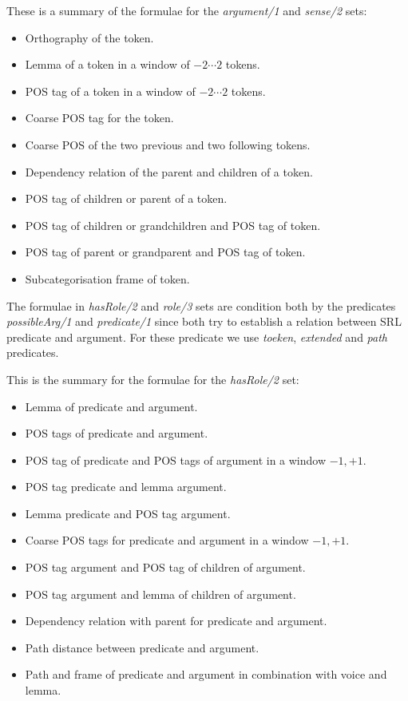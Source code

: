 These is a summary of the formulae for the \emph{argument/1} and 
\emph{sense/2} sets:
\begin{itemize}\addtolength{\itemsep}{-0.5\baselineskip}
    \item Orthography of the token.
    \item Lemma of a token in a window of $-2 \cdots 2$ tokens.
    \item POS tag of a token in a window of $-2 \cdots 2$ tokens.
    \item Coarse POS tag for the token.
    \item Coarse POS of the two previous and two following tokens.
    \item Dependency relation of the parent and children of a token.
    \item POS tag of children or parent of a token.
    \item POS tag of children or grandchildren and POS tag of token.
    \item POS tag of parent or grandparent and POS tag of token.
    \item Subcategorisation frame of token.
\end{itemize}

The formulae in \emph{hasRole/2} and \emph{role/3} sets are condition both by 
the predicates \emph{possibleArg/1} and \emph{predicate/1} since both try 
to establish a relation between SRL predicate and argument. For these predicate 
we use \emph{toeken}, \emph{extended} and \emph{path} predicates.

This is the summary for the formulae for the \emph{hasRole/2} set:
\begin{itemize}\addtolength{\itemsep}{-0.5\baselineskip}
    \item Lemma of predicate and argument.
    \item POS tags of predicate and argument.
    \item POS tag of predicate and POS tags of argument in a window $-1,+1$.
    \item POS tag predicate and lemma argument.
    \item Lemma predicate and POS tag argument.
    \item Coarse POS tags for predicate and argument in a window $-1,+1$.
    \item POS tag argument and POS tag of children of argument.
    \item POS tag argument and lemma  of children of argument.
    \item Dependency relation with parent for predicate and argument.
    \item Path distance between predicate and argument.
    \item Path and frame of predicate and argument in combination with voice and 
        lemma.
\end{itemize}

